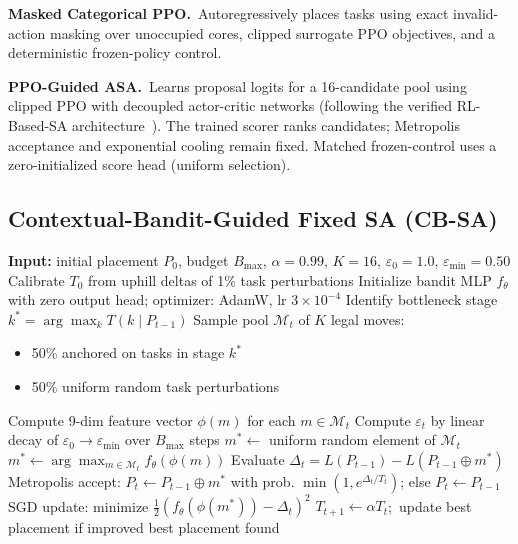\documentclass[10pt,conference]{IEEEtran}
\begin{document}
\textbf{Masked Categorical PPO.}\ Autoregressively places tasks using exact
invalid-action masking over unoccupied cores, clipped surrogate PPO objectives,
and a deterministic frozen-policy control.

\textbf{PPO-Guided ASA.}\ Learns proposal logits for a 16-candidate pool using
clipped PPO with decoupled actor-critic networks (following the verified
RL-Based-SA architecture~\cite{rl_based_sa_2025}).  The trained scorer ranks
candidates; Metropolis acceptance and exponential cooling remain fixed.  Matched
frozen-control uses a zero-initialized score head (uniform selection).

\subsection{Contextual-Bandit-Guided Fixed SA (CB-SA)}
\label{sec:cbsa-algo}

\begin{algorithm}[htbp]
  \caption{Contextual-Bandit-Guided Fixed SA (CB-SA)}
  \label{alg:cbsa}
  \begin{algorithmic}[1]
    \State \textbf{Input:} initial placement $P_0$, budget $B_{\max}$,
           $\alpha=0.99$, $K=16$, $\varepsilon_0=1.0$, $\varepsilon_{\min}=0.50$
    \State Calibrate $T_0$ from uphill deltas of 1\% task perturbations
    \State Initialize bandit MLP $f_\theta$ with zero output head;
           optimizer: AdamW, lr $3{\times}10^{-4}$
      \State Identify bottleneck stage $k^* = \arg\max_k T(k \mid P_{t-1})$
      \State Sample pool $\mathcal{M}_t$ of $K$ legal moves:
             \begin{itemize}[leftmargin=*,noitemsep]
               \item 50\% anchored on tasks in stage $k^*$
               \item 50\% uniform random task perturbations
             \end{itemize}
      \State Compute 9-dim feature vector $\phi(m)$ for each $m \in \mathcal{M}_t$
      \State Compute $\varepsilon_t$ by linear decay of $\varepsilon_0 \to \varepsilon_{\min}$ over $B_{\max}$ steps
        \State $m^* \leftarrow$ uniform random element of $\mathcal{M}_t$
      \Else
        \State $m^* \leftarrow \arg\max_{m \in \mathcal{M}_t} f_\theta(\phi(m))$
      \EndIf
      \State Evaluate $\Delta_t = L(P_{t-1}) - L(P_{t-1} \oplus m^*)$
      \State Metropolis accept: $P_t \leftarrow P_{t-1} \oplus m^*$ with prob.
             $\min(1, e^{\Delta_t / T_t})$; else $P_t \leftarrow P_{t-1}$
      \State SGD update: minimize $\tfrac{1}{2}(f_\theta(\phi(m^*)) - \Delta_t)^2$
      \State $T_{t+1} \leftarrow \alpha T_t$;\ update best placement if improved
    \EndFor
    \State \Return best placement found
  \end{algorithmic}
\end{algorithm}
\end{document}
